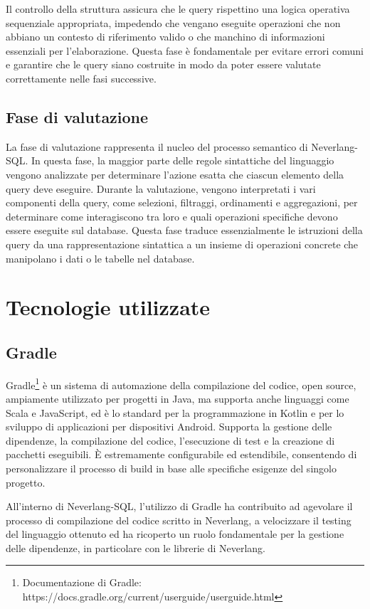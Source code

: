 \documentclass[12pt,a4paper,openright,twoside]{book}
\begin{document}
Il controllo della struttura assicura che le query rispettino una logica operativa sequenziale appropriata, impedendo che vengano eseguite 
operazioni che non abbiano un contesto di riferimento valido o che manchino di informazioni essenziali per l’elaborazione. Questa fase è 
fondamentale per evitare errori comuni e garantire che le query siano costruite in modo da poter essere valutate correttamente nelle fasi 
successive.

\subsection{Fase di valutazione}
La fase di valutazione rappresenta il nucleo del processo semantico di Neverlang-SQL. In questa fase, la maggior parte delle regole 
sintattiche del linguaggio vengono analizzate per determinare l’azione esatta che ciascun elemento della query deve eseguire. Durante la 
valutazione, vengono interpretati i vari componenti della query, come selezioni, filtraggi, ordinamenti e aggregazioni, per determinare come 
interagiscono tra loro e quali operazioni specifiche devono essere eseguite sul database. Questa fase traduce essenzialmente le istruzioni 
della query da una rappresentazione sintattica a un insieme di operazioni concrete che manipolano i dati o le tabelle nel database.


\section{Tecnologie utilizzate}

\subsection{Gradle}
Gradle\footnote{Documentazione di Gradle: https://docs.gradle.org/current/userguide/userguide.html} è un sistema di automazione della 
compilazione del codice, open source, ampiamente utilizzato per progetti in Java, ma supporta anche linguaggi come Scala e JavaScript, ed è 
lo standard per la programmazione in Kotlin e per lo sviluppo di applicazioni per dispositivi Android. Supporta la gestione delle dipendenze, 
la compilazione del codice, l’esecuzione di test e la creazione di pacchetti eseguibili. È estremamente configurabile ed estendibile, 
consentendo di personalizzare il processo di build in base alle specifiche esigenze del singolo progetto.

All’interno di Neverlang-SQL, l’utilizzo di Gradle ha contribuito ad agevolare il processo di compilazione del codice scritto in Neverlang, a 
velocizzare il testing del linguaggio ottenuto ed ha ricoperto un ruolo fondamentale per la gestione delle dipendenze, in particolare con le 
librerie di Neverlang.
\end{document}
